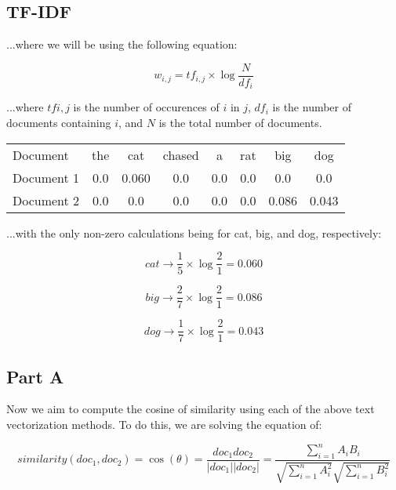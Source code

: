 \documentclass{article}
\begin{document}
\subsection*{TF-IDF}

\noindent ...where we will be using the following equation:

\begin{equation}
    w_{i,j} = tf_{i,j} \times \log{\frac{N}{df_i}}
\end{equation}

\noindent ...where $tf{i,j}$ is the number of occurences of $i$ in $j$, $df_i$ is the number of documents containing $i$, and $N$ is the total number of documents.

\begin{center}
    \begin{tabular}{ l c c c c c c c }
        Document & the & cat & chased & a & rat & big & dog \\
        Document 1 & 0.0 & 0.060 & 0.0 & 0.0 & 0.0 & 0.0 & 0.0 \\
        Document 2 & 0.0 & 0.0 & 0.0 & 0.0 & 0.0 & 0.086 & 0.043\\
    \end{tabular}
\end{center}

\noindent ...with the only non-zero calculations being for cat, big, and dog, respectively:

\begin{equation}
    cat \rightarrow \frac{1}{5} \times \log{\frac{2}{1}} = 0.060
\end{equation}

\begin{equation}
    big \rightarrow \frac{2}{7} \times \log{\frac{2}{1}} = 0.086
\end{equation}

\begin{equation}
    dog \rightarrow \frac{1}{7} \times \log{\frac{2}{1}} = 0.043
\end{equation}

\subsection*{Part A}

Now we aim to compute the cosine of similarity using each of the above text vectorization methods. To do this, we are solving the equation of:

\begin{equation}
    similarity(doc_1, doc_2) = \cos(\theta) = \frac{doc_1 doc_2}{\lvert doc_1 \rvert \lvert doc_2 \rvert} = \frac{\sum^n_{i=1} A_i B_i}{\sqrt{\sum^{n}_{i=1} A^2_i} \sqrt{\sum^n_{i=1} B^2_i}}
\end{equation}
\end{document}
